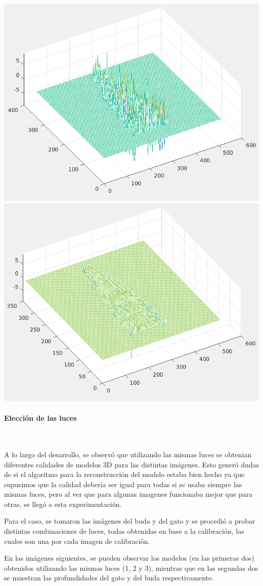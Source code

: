 \begin{center}
\includegraphics[width=.4\linewidth]{imagenes/calib-ruido.png}
\includegraphics[width=.4\linewidth]{imagenes/luces-limpio.png}
\end{center}

\paragraph{Elección de las luces}
\

A lo largo del desarrollo, se observó que utilizando las mismas luces se obtenian diferentes calidades de modelos 3D para las distintas imágenes. Esto generó dudas de si el algoritmo para la reconstrucción del modelo estaba bien hecho ya que supusimos que la calidad debería ser igual para todas si se usaba siempre las mismas luces, pero al ver que para algunas imagenes funcionaba mejor que para otras, se llegó a esta experimentación.

Para el caso, se tomaron las imágenes del buda y del gato y se procedió a probar distintas combinaciones de luces, todas obtenidas en base a la calibración, las cuales son una por cada imagen de calibración.

En las imágenes siguientes, se pueden observar los modelos (en las primeras dos) obtenidos utilizando las mismas luces (1, 2 y 3), mientras que en las segundas dos se muestran las profundidades del gato y del buda respectivamente.

